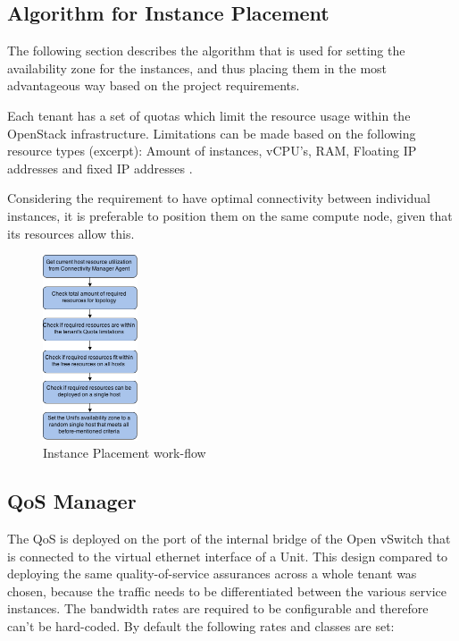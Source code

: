 \subsection{Algorithm for Instance Placement}

The following section describes the algorithm that is used for setting the availability zone for the instances, and thus placing them in the most advantageous way based on the project requirements.

Each tenant has a set of quotas which limit the resource usage within the OpenStack infrastructure. Limitations can be made based on the following resource types (excerpt): Amount of instances, vCPU's, RAM, Floating IP addresses and fixed IP addresses \cite{openstack-admin}.

Considering the requirement to have optimal connectivity between individual instances, it is preferable to position them on the same compute node, given that its resources allow this.

\begin{figure}[H]
\centering

\includegraphics[width=0.25\textwidth]{images/design/cm_instance_placement_engine.png}

\caption{Instance Placement work-flow}
\end{figure}


\subsection{QoS Manager}

The QoS is deployed on the port of the internal bridge of the Open vSwitch that is connected to the virtual ethernet interface of a Unit. This design compared to deploying the same quality-of-service assurances across a whole tenant was chosen, because the traffic needs to be differentiated between the various service instances. The bandwidth rates are required to be configurable and therefore can't be hard-coded. By default the following rates and classes are set:

